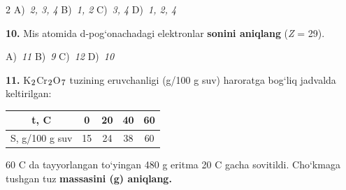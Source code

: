\documentclass[11pt,a4paper]{article}
\renewcommand{\textsubscript}[1]{\ensuremath{_{\text{\fontsize{8}{8}\selectfont #1}}}}
\begin{document}
\begin{multicols}{2}
\noindent A)~\textsl{2, 3, 4} \hfill B)~\textsl{1, 2} \hfill C)~\textsl{3, 4} \hfill D)~\textsl{1, 2, 4}\par
\vspace{4pt}
\noindent\textbf{10.} Mis atomida d-pog`onachadagi elektronlar \textbf{sonini aniqlang} (\textit{Z} = 29).

\noindent A)~\textsl{11} \hfill B)~\textsl{9} \hfill C)~\textsl{12} \hfill D)~\textsl{10}\par
\vspace{4pt}
\end{multicols}
\noindent\textbf{11.} K\textsubscript{2}Cr\textsubscript{2}O\textsubscript{7} tuzining eruvchanligi (g/100 g suv) haroratga bog`liq jadvalda keltirilgan:
\begin{center}
\renewcommand{\arraystretch}{1.15}
\begin{tabular}{|c|c|c|c|c|}\hline
\textbf{t, \textdegree{}C} & \textbf{0} & \textbf{20} & \textbf{40} & \textbf{60} \\ \hline
S, g/100 g suv & 15 & 24 & 38 & 60 \\ \hline
\end{tabular}
\end{center}
60 \textdegree{}C da tayyorlangan to`yingan 480 g eritma 20 \textdegree{}C gacha sovitildi. Cho`kmaga tushgan tuz \textbf{massasini (g) aniqlang.}
\end{document}
